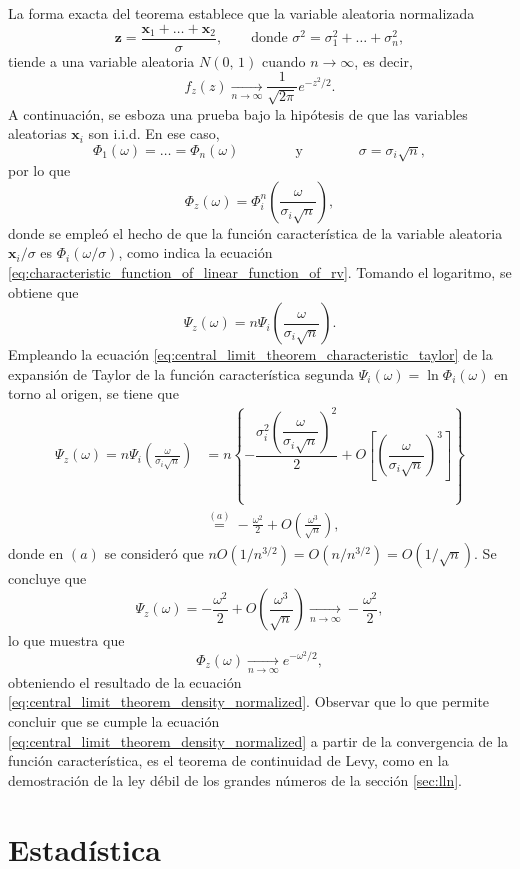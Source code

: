 \documentclass[a4paper]{report}
\newcommand{\x}{\mathbf{x}}
\newcommand{\z}{\mathbf{z}}
\begin{document}
La forma exacta del teorema establece que la variable aleatoria normalizada
\[
 \z=\frac{\x_1+\dots+\x_2}{\sigma},\qquad\textrm{donde }\sigma^2=\sigma_1^2+\dots+\sigma_n^2,
\]
tiende a una variable aleatoria \(N(0,\,1)\) cuando \(n\to\infty\), es decir,
\begin{equation}\label{eq:central_limit_theorem_density_normalized}
  f_z(z)\xrightarrow[n\to\infty]{}\frac{1}{\sqrt{2\pi}}e^{-z^2/2}.
\end{equation}
A continuación, se esboza una prueba bajo la hipótesis de que las variables aleatorias \(\x_i\) son i.i.d. En ese caso,
\[
 \Phi_1(\omega)=\dots=\Phi_n(\omega)\qquad\qquad\textrm{y}\qquad\qquad\sigma=\sigma_i\sqrt{n},
\]
por lo que 
\[
 \Phi_z(\omega)=\Phi_i^n\left(\frac{\omega}{\sigma_i\sqrt{n}}\right), 
\]
donde se empleó el hecho de que la función característica de la variable aleatoria \(\x_i/\sigma\) es \(\Phi_i(\omega/\sigma)\), como indica la ecuación \ref{eq:characteristic_function_of_linear_function_of_rv}. Tomando el logaritmo, se obtiene que 
\[
 \Psi_z(\omega)=n\Psi_i\left(\frac{\omega}{\sigma_i\sqrt{n}}\right).
\]
Empleando la ecuación \ref{eq:central_limit_theorem_characteristic_taylor} de la expansión de Taylor de la función característica segunda \(\Psi_i(\omega)=\ln\Phi_i(\omega)\) en torno al origen, se tiene que 
\begin{align*}
 \Psi_z(\omega)=n\Psi_i\left(\frac{\omega}{\sigma_i\sqrt{n}}\right)&=n\left\{-\dfrac{\sigma_i^2\left(\dfrac{\omega}{\sigma_i\sqrt{n}}\right)^2}{2}+O\left[\left(\dfrac{\omega}{\sigma_i\sqrt{n}}\right)^3\right]\right\}\\
   &\overset{(a)}{=}-\frac{\omega^2}{2}+O\left(\frac{\omega^3}{\sqrt{n}}\right),
\end{align*}
donde en \((a)\) se consideró que \(nO(1/n^{3/2})=O(n/n^{3/2})=O(1/\sqrt{n})\). Se concluye que
\[
 \Psi_z(\omega)=-\frac{\omega^2}{2}+O\left(\frac{\omega^3}{\sqrt{n}}\right)
 \xrightarrow[n\to\infty]{}-\frac{\omega^2}{2},
\]
lo que muestra que 
\[
 \Phi_z(\omega)\xrightarrow[n\to\infty]{}e^{-\omega^2/2},
\]
obteniendo el resultado de la ecuación \ref{eq:central_limit_theorem_density_normalized}. Observar que lo que permite concluir que se cumple la ecuación \ref{eq:central_limit_theorem_density_normalized} a partir de la convergencia de la función característica, es el teorema de continuidad de Levy, como en la demostración de la ley débil de los grandes números de la sección \ref{sec:lln}.

\chapter{Estadística}
\end{document}
